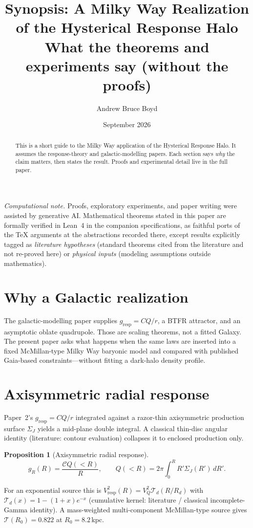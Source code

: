 \documentclass[11pt]{article}
\title{\textbf{Synopsis: A Milky Way Realization of the Hysterical Response Halo}\\[0.35em]
\large What the theorems and experiments say (without the proofs)}
\author{Andrew Bruce Boyd}
\date{September 2026}
\newtheorem{proposition}[theorem]{Proposition}
\theoremstyle{definition}
\theoremstyle{remark}
\begin{document}
\maketitle
\noindent\textit{Computational note.}
Proofs, exploratory experiments, and paper writing were assisted by generative AI.
Mathematical theorems stated in this paper are formally verified in Lean~4 in the
companion specifications, as faithful ports of the TeX arguments at the abstractions
recorded there, except results explicitly tagged as \emph{literature hypotheses}
(standard theorems cited from the literature and not re-proved here) or
\emph{physical inputs} (modeling assumptions outside mathematics).

\begin{abstract}
This is a short guide to the Milky Way application of the Hysterical Response Halo.
It assumes the response-theory and galactic-modelling papers.
Each section says \emph{why} the claim matters, then states the result.
Proofs and experimental detail live in the full paper.
\end{abstract}

\section{Why a Galactic realization}
The galactic-modelling paper supplies $g_{\mathrm{resp}}=CQ/r$, a BTFR attractor, and an asymptotic oblate quadrupole.
Those are scaling theorems, not a fitted Galaxy.
The present paper asks what happens when the same laws are inserted into a fixed McMillan-type Milky Way baryonic model and compared with published Gaia-based constraints---without fitting a dark-halo density profile.

\section{Axisymmetric radial response}
Paper~2's $g_{\mathrm{resp}}=CQ/r$ integrated against a razor-thin axisymmetric production surface $\Sigma_J$ yields a mid-plane double integral.
A classical thin-disc angular identity (literature: contour evaluation) collapses it to enclosed production only.

\begin{proposition}[Axisymmetric radial response]
\[
  g_R(R)=\frac{\mathcal C Q(<R)}{R},
  \qquad
  Q(<R)=2\pi\int_0^R R'\Sigma_J(R')\,dR'.
\]
\end{proposition}

For an exponential source this is $V_{\mathrm{resp}}^2(R)=V_Q^2\mathcal T_d(R/R_d)$ with $\mathcal T_d(x)=1-(1+x)e^{-x}$ (cumulative kernel: literature / classical incomplete-Gamma identity).
A mass-weighted multi-component McMillan-type source gives $\mathcal T(R_0)=0.822$ at $R_0=8.2\,$kpc.
\end{document}
